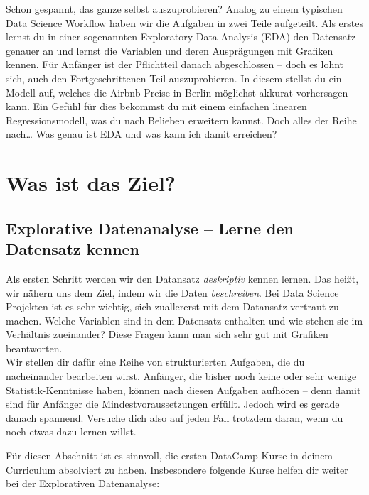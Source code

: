 \documentclass[
]{book}
\begin{document}
Schon gespannt, das ganze selbst auszuprobieren? Analog zu einem typischen Data Science Workflow haben wir die Aufgaben in zwei Teile aufgeteilt.
Als erstes lernst du in einer sogenannten Exploratory Data Analysis (EDA) den Datensatz genauer an und lernst die Variablen und deren Ausprägungen mit Grafiken kennen.
Für Anfänger ist der Pflichtteil danach abgeschlossen -- doch es lohnt sich, auch den Fortgeschrittenen Teil auszuprobieren.
In diesem stellst du ein Modell auf, welches die Airbnb-Preise in Berlin möglichst akkurat vorhersagen kann.
Ein Gefühl für dies bekommst du mit einem einfachen linearen Regressionsmodell, was du nach Belieben erweitern kannst.
Doch alles der Reihe nach\ldots{} Was genau ist EDA und was kann ich damit erreichen?

\hypertarget{was-ist-das-ziel}{%
\section{Was ist das Ziel?}\label{was-ist-das-ziel}}

\hypertarget{explorative-datenanalyse-lerne-den-datensatz-kennen}{%
\subsection{Explorative Datenanalyse -- Lerne den Datensatz kennen}\label{explorative-datenanalyse-lerne-den-datensatz-kennen}}

Als ersten Schritt werden wir den Datansatz \emph{deskriptiv} kennen lernen. Das heißt, wir nähern uns dem Ziel, indem wir die Daten \emph{beschreiben}.
Bei Data Science Projekten ist es sehr wichtig, sich zuallererst mit dem Datansatz vertraut zu machen.
Welche Variablen sind in dem Datensatz enthalten und wie stehen sie im Verhältnis zueinander? Diese Fragen kann man sich sehr gut mit Grafiken beantworten.\\
Wir stellen dir dafür eine Reihe von strukturierten Aufgaben, die du nacheinander bearbeiten wirst. Anfänger, die bisher noch keine oder sehr wenige Statistik-Kenntnisse haben, können nach diesen Aufgaben aufhören -- denn damit sind für Anfänger die Mindestvoraussetzungen erfüllt.
Jedoch wird es gerade danach spannend.
Versuche dich also auf jeden Fall trotzdem daran, wenn du noch etwas dazu lernen willst.

Für diesen Abschnitt ist es sinnvoll, die ersten DataCamp Kurse in deinem Curriculum absolviert zu haben. Insbesondere folgende Kurse helfen dir weiter bei der Explorativen Datenanalyse:
\end{document}
